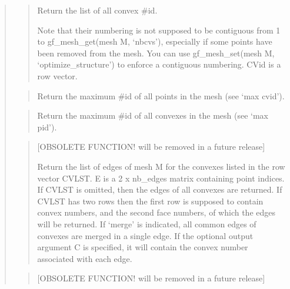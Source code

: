 \documentclass[a4paper,11pt,english]{sphinxmanual}
\begin{document}
\begin{quote}
\begin{quote}
\sphinxAtStartPar
Return the list of all convex \#id.

\sphinxAtStartPar
Note that their numbering is not supposed to be contiguous from
1 to gf\_mesh\_get(mesh M, ‘nbcvs’),
especially if some points have been removed from the mesh. You
can use gf\_mesh\_set(mesh M, ‘optimize\_structure’) to enforce a contiguous
numbering. CVid is a row vector.
\end{quote}

\sphinxAtStartPar
{}
\begin{quote}

\sphinxAtStartPar
Return the maximum \#id of all points in the mesh (see ‘max cvid’).
\end{quote}

\sphinxAtStartPar
{}
\begin{quote}

\sphinxAtStartPar
Return the maximum \#id of all convexes in the mesh (see ‘max pid’).
\end{quote}

\sphinxAtStartPar
{}
\begin{quote}

\sphinxAtStartPar
{[}OBSOLETE FUNCTION! will be removed in a future release{]}

\sphinxAtStartPar
Return the list of edges of mesh M for the convexes listed in the
row vector CVLST. E is a 2 x nb\_edges matrix containing point
indices. If CVLST is omitted, then the edges of all convexes are
returned. If CVLST has two rows then the first row is supposed to
contain convex numbers, and the second face numbers, of which the
edges will be returned.  If ‘merge’ is indicated, all common
edges of convexes are merged in a single edge.  If the optional
output argument C is specified, it will contain the convex number
associated with each edge.
\end{quote}

\sphinxAtStartPar
{}
\begin{quote}

\sphinxAtStartPar
{[}OBSOLETE FUNCTION! will be removed in a future release{]}


\end{quote}
\end{quote}
\end{document}

